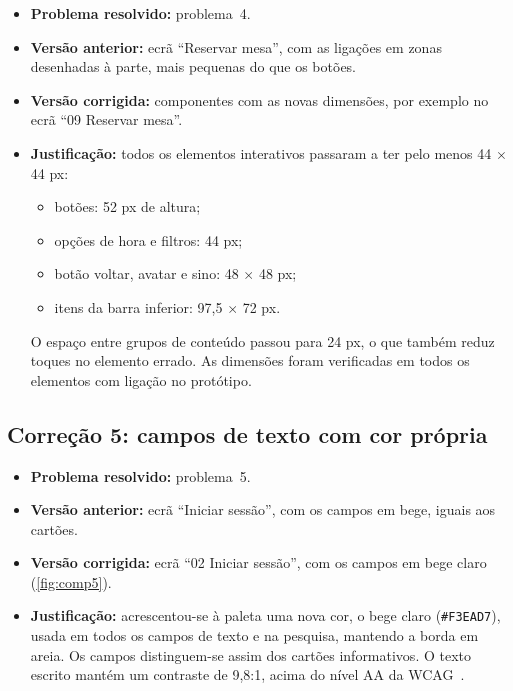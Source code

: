 \begin{itemize}
  \item \textbf{Problema resolvido:} problema~4.
  \item \textbf{Versão anterior:} ecrã ``Reservar mesa'', com as ligações em zonas desenhadas à
        parte, mais pequenas do que os botões.
  \item \textbf{Versão corrigida:} componentes com as novas dimensões, por exemplo no ecrã
        ``09 \textperiodcentered{} Reservar mesa''.
  \item \textbf{Justificação:} todos os elementos interativos passaram a ter pelo menos
        44 $\times$ 44 px:
    \begin{itemize}
      \item botões: 52 px de altura;
      \item opções de hora e filtros: 44 px;
      \item botão voltar, avatar e sino: 48 $\times$ 48 px;
      \item itens da barra inferior: 97,5 $\times$ 72 px.
    \end{itemize}
    O espaço entre grupos de conteúdo passou para 24 px, o que também reduz toques no elemento
    errado. As dimensões foram verificadas em todos os elementos com ligação no protótipo.
\end{itemize}


\subsection{Correção 5: campos de texto com cor própria}

\begin{itemize}
  \item \textbf{Problema resolvido:} problema~5.
  \item \textbf{Versão anterior:} ecrã ``Iniciar sessão'', com os campos em bege, iguais aos
        cartões.
  \item \textbf{Versão corrigida:} ecrã ``02 \textperiodcentered{} Iniciar sessão'', com os
        campos em bege claro (\autoref{fig:comp5}).
  \item \textbf{Justificação:} acrescentou-se à paleta uma nova cor, o bege claro
        (\texttt{\#F3EAD7}), usada em todos os campos de texto e na pesquisa, mantendo a borda
        em areia. Os campos distinguem-se assim dos cartões informativos. O texto escrito mantém
        um contraste de 9,8:1, acima do nível AA da WCAG~\cite{wcag}.
\end{itemize}

